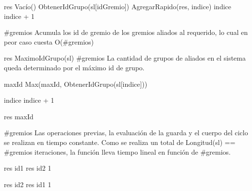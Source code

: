 {
 	\state res \asig Vac\'io() 															
 	\state {} 													
 	\state {} \asig ObtenerIdGrupo(sl[idGremio])					
 	\state 	
 							
 		\state {}							
		  \state AgregarRapido(res, indice)												
		\endif
 		\state
 		\state indice \asig indice + 1													
 	\endwhile

}
{\#gremios}
{Acumula los id de gremio de los gremios aliados al requerido, lo cual en peor caso cuesta O(\#gremios)}


{
	\state res \asig MaximoIdGrupo(sl)						
}
{\#gremios}
{La cantidad de grupos de aliados en el sistema queda determinado por el m\'aximo id de grupo.}

{
	\state {} 									

	\state
	\state {} 								
									
		\state
		
		\state maxId \asig Max(maxId, ObtenerIdGrupo(sl[indice]))			

		\state
		\state indice \asig indice + 1								
	\endwhile
	\state

	\state res \asig maxId											
}
{ \#gremios }
{ Las operaciones previas, la evaluaci\'on de la guarda y el cuerpo del ciclo se realizan en tiempo constante. Como se realiza un total de Longitud(sl) == \#gremios iteraciones, la funci\'on lleva tiempo lineal en funci\'on de \#gremios. }



{
						
		\state res \asig id1			
	\Else
		\state res \asig id2			
	\endif
}
{1}
{}



{
						
		\state res \asig id2			
	\Else
		\state res \asig id1			
	\endif
}
{1}
{}

